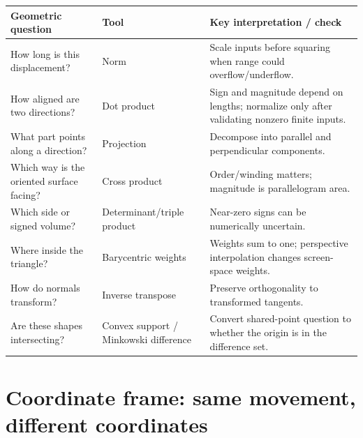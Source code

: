 {\def\LTcaptype{none} %
\begin{longtable}[]{@{}
  >{\raggedright\arraybackslash}p{}
  >{\raggedright\arraybackslash}p{}
  >{\raggedright\arraybackslash}p{}@{}}
\toprule\noalign{}
\begin{minipage}[b]{\linewidth}\raggedright
Geometric question
\end{minipage} & \begin{minipage}[b]{\linewidth}\raggedright
Tool
\end{minipage} & \begin{minipage}[b]{\linewidth}\raggedright
Key interpretation / check
\end{minipage} \\
\midrule\noalign{}
\endhead
\bottomrule\noalign{}
\endlastfoot
How long is this displacement? & Norm & Scale inputs before squaring when range could overflow/underflow. \\
How aligned are two directions? & Dot product & Sign and magnitude depend on lengths; normalize only after validating nonzero finite inputs. \\
What part points along a direction? & Projection & Decompose into parallel and perpendicular components. \\
Which way is the oriented surface facing? & Cross product & Order/winding matters; magnitude is parallelogram area. \\
Which side or signed volume? & Determinant/triple product & Near-zero signs can be numerically uncertain. \\
Where inside the triangle? & Barycentric weights & Weights sum to one; perspective interpolation changes screen-space weights. \\
How do normals transform? & Inverse transpose & Preserve orthogonality to transformed tangents. \\
Are these shapes intersecting? & Convex support / Minkowski difference & Convert shared-point question to whether the origin is in the difference set. \\
\end{longtable}
}

\section{Coordinate frame: same movement, different coordinates}\label{appendix-38d9c8aca357-coordinate-frame-same-movement-different-coordinates}

